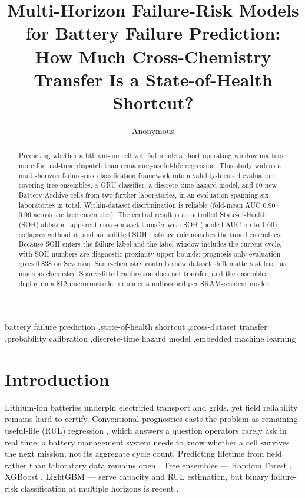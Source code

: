 \documentclass[preprint,12pt]{elsarticle}
\begin{document}
\begin{frontmatter}
\title{Multi-Horizon Failure-Risk Models for Battery Failure Prediction: How Much Cross-Chemistry Transfer Is a State-of-Health Shortcut?}
\author{Anonymous}
\address{Affiliation 1, City, Country (e-mail: author1@example.com)}
\begin{abstract}
Predicting whether a lithium-ion cell will fail inside a short operating window matters more for real-time dispatch than remaining-useful-life regression. This study widens a multi-horizon failure-risk classification framework into a validity-focused evaluation covering tree ensembles, a GRU classifier, a discrete-time hazard model, and 60 new Battery Archive cells from two further laboratories, in an evaluation spanning six laboratories in total. Within-dataset discrimination is reliable (fold-mean AUC 0.90--0.96 across the tree ensembles). The central result is a controlled State-of-Health (SOH) ablation: apparent cross-dataset transfer with SOH (pooled AUC up to 1.00) collapses without it, and an unfitted SOH distance rule matches the tuned ensembles. Because SOH enters the failure label and the label window includes the current cycle, with-SOH numbers are diagnostic-proximity upper bounds: prognosis-only evaluation gives 0.838 on Severson. Same-chemistry controls show dataset shift matters at least as much as chemistry. Source-fitted calibration does not transfer, and the ensembles deploy on a \$12 microcontroller in under a millisecond per SRAM-resident model.
\end{abstract}
\begin{keyword}
battery failure prediction \sep state-of-health shortcut \sep cross-dataset transfer \sep probability calibration \sep discrete-time hazard model \sep embedded machine learning
\end{keyword}
\end{frontmatter}

\section{Introduction}
Lithium-ion batteries underpin electrified transport and grids, yet field reliability remains hard to certify. Conventional prognostics casts the problem as remaining-useful-life (RUL) regression \cite{meng2019review,roman2021machine}, which answers a question operators rarely ask in real time: a battery management system needs to know whether a cell survives the next mission, not its aggregate cycle count. Predicting lifetime from field rather than laboratory data remains open \cite{sulzer2021challenge}. Tree ensembles --- Random Forest \cite{breiman2001random}, XGBoost \cite{chen2016xgboost}, LightGBM \cite{ke2017lightgbm} --- serve capacity and RUL estimation, but binary failure-risk classification at multiple horizons is recent \cite{shikdar2026learning}.
\end{document}
